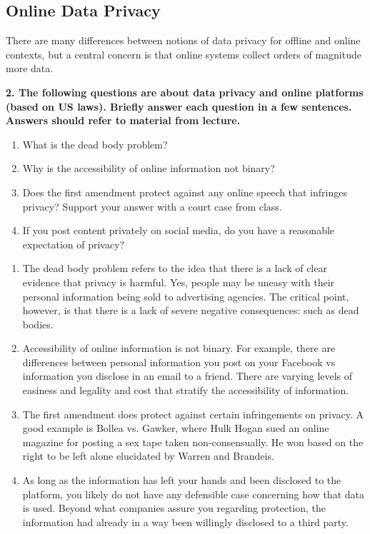 \documentclass{article}
\begin{document}
\subsection*{Online Data Privacy}

There are many differences between notions of data privacy for offline and online contexts, but a central concern is that online systems collect orders of magnitude more data.  

\textbf{2. The following questions are about data privacy and online platforms (based on US laws). Briefly answer each question in a few sentences. Answers should refer to material from lecture.}
\begin{enumerate}[label=\Alph*.]
\item What is the dead body problem?
\item Why is the accessibility of online information not binary? 
\item Does the first amendment protect against any online speech that infringes privacy? Support your answer with a court case from class.
\item If you post content privately on social media, do you have a reasonable expectation of privacy?
\end{enumerate}

\bigskip

\begin{mdframed}
\begin{enumerate}[label=\Alph*.]
\item The dead body problem refers to the idea that there is a lack of clear evidence that privacy is harmful. Yes, people may be uneasy with their personal information being sold to advertising agencies. The critical point, however, is that there is a lack of severe negative consequences: such as dead bodies.
\item Accessibility of online information is not binary. For example, there are differences between personal information you post on your Facebook vs information you disclose in an email to a friend. There are varying levels of easiness and legality and cost that stratify the accessibility of information.
\item The first amendment does protect against certain infringements on privacy. A good example is Bollea vs. Gawker, where Hulk Hogan sued an online magazine for posting a sex tape taken non-consensually. He won based on the right to be left alone elucidated by Warren and Brandeis. 
\item As long as the information has left your hands and been disclosed to the platform, you likely do not have any defensible case concerning how that data is used. Beyond what companies assure you regarding protection, the information had already in a way been willingly disclosed to a third party. 
\end{enumerate}
\end{mdframed}
\bigskip
\end{document}
